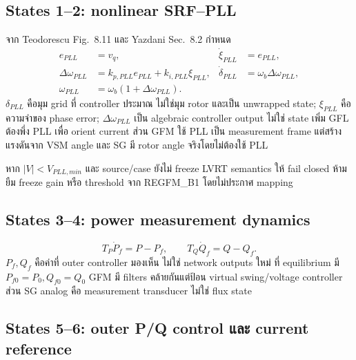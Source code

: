 \documentclass[12pt,a4paper]{article}
\begin{document}
\subsection{States 1--2: nonlinear SRF--PLL}

จาก Teodorescu Fig.~8.11 และ Yazdani Sec.~8.2 กำหนด
\begin{align}
e_{PLL}&=v_q, & \dot\xi_{PLL}&=e_{PLL},\\
\Delta\omega_{PLL}&=k_{p,PLL}e_{PLL}+k_{i,PLL}\xi_{PLL},&
\dot\delta_{PLL}&=\omega_b\Delta\omega_{PLL},\\
\omega_{PLL}&=\omega_b(1+\Delta\omega_{PLL}).
\label{eq:gfl10-pll}
\end{align}
$\delta_{PLL}$ คือมุม grid ที่ controller ประมาณ ไม่ใช่มุม rotor และเป็น unwrapped state;
$\xi_{PLL}$ คือความจำของ phase error; $\Delta\omega_{PLL}$ เป็น algebraic controller
output ไม่ใช่ state เพิ่ม GFL ต้องพึ่ง PLL เพื่อ orient current ส่วน GFM ใช้ PLL เป็น
measurement frame แต่สร้างแรงดันจาก VSM angle และ SG มี rotor angle จริงโดยไม่ต้องใช้ PLL

หาก $|V|<V_{PLL,min}$ และ source/case ยังไม่ freeze LVRT semantics ให้ fail closed
ห้ามยืม freeze gain หรือ threshold จาก REGFM\_B1 โดยไม่ประกาศ mapping

\subsection{States 3--4: power measurement dynamics}

\begin{equation}
T_P\dot P_f=P-P_f,\qquad T_Q\dot Q_f=Q-Q_f.
\label{eq:gfl10-pfilters}
\end{equation}
$P_f,Q_f$ คือค่าที่ outer controller มองเห็น ไม่ใช่ network outputs ใหม่
ที่ equilibrium มี $P_{f0}=P_0,Q_{f0}=Q_0$ GFM มี filters คล้ายกันแต่ป้อน virtual
swing/voltage controller ส่วน SG analog คือ measurement transducer ไม่ใช่ flux state

\subsection{States 5--6: outer P/Q control และ current reference}
\end{document}
